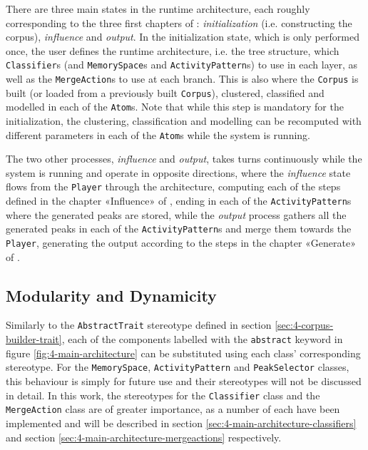  There are three main states in the runtime architecture, each roughly corresponding to the three first chapters of \cite{somaxtheory2021}: \textit{initialization} (i.e. constructing the corpus), \textit{influence} and \textit{output}.  In the initialization state, which is only performed once, the user defines the runtime architecture, i.e. the tree structure, which \texttt{Classifier}s (and \texttt{Memory\-Space}s and \texttt{Activity\-Pattern}s) to use in each layer, as well as the \texttt{MergeAction}s to use at each branch. This is also where the \texttt{Corpus} is built (or loaded from a previously built \texttt{Corpus}), clustered, classified and modelled in each of the \texttt{Atom}s. Note that while this step is mandatory for the initialization, the clustering, classification and modelling can be recomputed with different parameters in each of the \texttt{Atom}s while the system is running. 
 
 The two other processes, \textit{influence} and \textit{output}, takes turns continuously while the system is running and operate in opposite directions, where the \textit{influence} state flows from the \texttt{Player} through the architecture, computing each of the steps defined in the chapter «Influence» of \cite{somaxtheory2021}, ending in each of the \texttt{ActivityPattern}s where the generated peaks are stored, while the \textit{output} process gathers all the generated peaks in each of the \texttt{ActivityPattern}s and merge them towards the \texttt{Player}, generating the output according to the steps in the chapter «Generate» of \cite{somaxtheory2021}.
 
 
 \subsection{Modularity and Dynamicity}\label{sec:4-main-architecture-modularity}
 Similarly to the \texttt{AbstractTrait} stereotype defined in section \ref{sec:4-corpus-builder-trait}, each of the components labelled with the \texttt{abstract} keyword in figure \ref{fig:4-main-architecture} can be substituted using each class' corresponding stereotype. For the \texttt{MemorySpace}, \texttt{ActivityPattern} and \texttt{PeakSelector} classes, this behaviour is simply for future use and their stereotypes will not be discussed in detail. In this work, the stereotypes for the \texttt{Classifier} class and the \texttt{MergeAction} class are of greater importance, as a number of each have been implemented and will be described in section \ref{sec:4-main-architecture-classifiers} and section \ref{sec:4-main-architecture-mergeactions} respectively.
 
